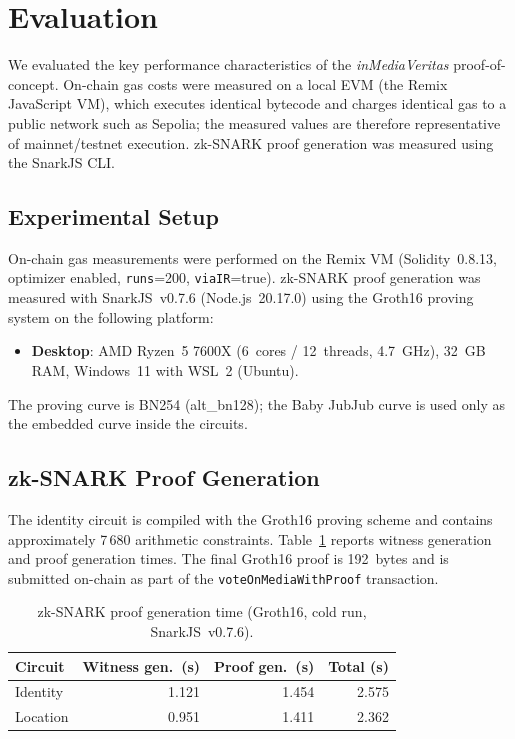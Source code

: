 \documentclass[11pt]{article}
\begin{document}
\section{Evaluation}

We evaluated the key performance characteristics of the \textit{inMediaVeritas}
proof-of-concept. On-chain gas costs were measured on a local EVM (the Remix
JavaScript VM), which executes identical bytecode and charges identical gas to
a public network such as Sepolia; the measured values are therefore
representative of mainnet/testnet execution. zk-SNARK proof generation was
measured using the SnarkJS CLI.

\subsection{Experimental Setup}

On-chain gas measurements were performed on the Remix VM
(Solidity~0.8.13, optimizer enabled, \texttt{runs}=200, \texttt{viaIR}=true).
zk-SNARK proof generation was measured with SnarkJS~v0.7.6 (Node.js~20.17.0)
using the Groth16 proving system on the following platform:
\begin{itemize}[noitemsep]
  \item \textbf{Desktop}: AMD Ryzen~5 7600X (6~cores / 12~threads, 4.7~GHz),
        32~GB RAM, Windows~11 with WSL~2 (Ubuntu).
\end{itemize}
The proving curve is BN254 (alt\_bn128); the Baby JubJub curve is used only as
the embedded curve inside the circuits.

\subsection{zk-SNARK Proof Generation}

The identity circuit is compiled with the Groth16 proving scheme and contains
approximately 7\,680 arithmetic constraints.
Table~\ref{tab:snark} reports witness generation and proof generation times.
The final Groth16 proof is 192~bytes and is submitted on-chain as part of the
\texttt{voteOnMediaWithProof} transaction.

\begin{table}[ht]
\centering
\small
\caption{zk-SNARK proof generation time (Groth16, cold run, SnarkJS~v0.7.6).}%
\label{tab:snark}
\begin{tabular}{lrrr}
\toprule
Circuit & Witness gen.\ (s) & Proof gen.\ (s) & Total (s) \\
\midrule
Identity & 1.121 & 1.454 & 2.575 \\
Location & 0.951 & 1.411 & 2.362 \\
\bottomrule
\end{tabular}
\end{table}
\end{document}
